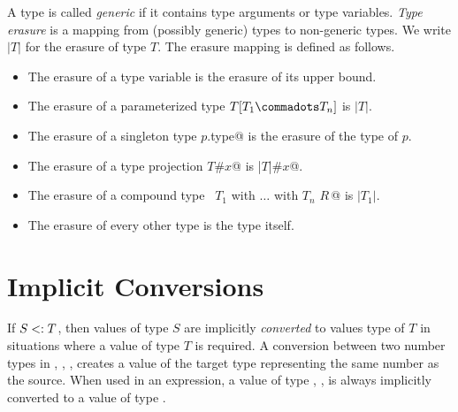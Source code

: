 \documentclass[a4paper,12pt,twoside,titlepage]{book}
\begin{document}
A type is called {\em generic} if it contains type arguments or type variables.
{\em Type erasure} is a mapping from (possibly generic) types to
non-generic types. We write $|T|$ for the erasure of type $T$.
The erasure mapping is defined as follows.
\begin{itemize}
\item The erasure of a type variable is the erasure of its upper bound.
\item The erasure of a parameterized type $T[T_1 \commadots T_n]$ is $|T|$.
\item The erasure of a singleton type \lstinline@$p$.type@ is the 
      erasure of the type of $p$.
\item The erasure of a type projection \lstinline@$T$#$x$@ is \lstinline@|$T$|#$x$@.
\item The erasure of a compound type ~\lstinline@$T_1$ with $\ldots$ with $T_n$ {$R\,$}@ 
      is $|T_1|$.
\item The erasure of every other type is the type itself.
\end{itemize}

\section{Implicit Conversions}
\label{sec:impl-conv}

If $S <: T$, then values of type $S$ are implicitly {\em
converted} to values type of $T$ in situations where a value of type
$T$ is required. A conversion between two number types in ,
, ,  creates a value of the target
type representing the same number as the source.  When used in an
expression, a value of type , ,  is
always implicitly converted to a value of type .
\end{document}
